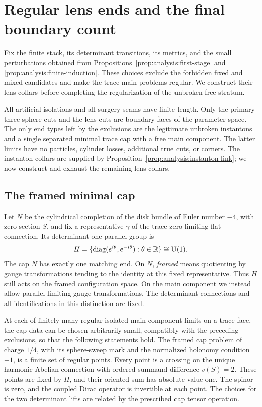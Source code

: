 \section{Regular lens ends and the final boundary count}
\label{sec:gluing}

Fix the finite stack, its determinant transitions, its metrics, and the
small perturbations obtained from Propositions~\ref{prop:analysis:first-stage}
and \ref{prop:analysis:finite-induction}.  These choices exclude the
forbidden fixed and mixed candidates and make the trace-main problems
regular.  We construct their lens collars before completing the
regularization of the unbroken free stratum.

All artificial isolations and all surgery seams have finite length.
Only the primary three-sphere cuts and the lens cuts are boundary
faces of the parameter space.  The only end types left by the exclusions
are the legitimate unbroken instantons and a single separated minimal
trace cap with a free main component.  The latter limits have no
particles, cylinder losses, additional true cuts, or corners.
The instanton collars are supplied by
Proposition~\ref{prop:analysis:instanton-link}; we now construct and
exhaust the remaining lens collars.

\subsection{The framed minimal cap}

Let $N$ be the cylindrical completion of the disk bundle of Euler number
$-4$, with zero section $S$, and fix a representative $\gamma$ of the
trace-zero limiting flat connection.  Its determinant-one parallel group
is
\[
 H=\{\operatorname{diag}(e^{i\theta},e^{-i\theta}):\theta\in\mathbb R\}
 \cong\operatorname{U}(1).
\]
The cap $N$ has exactly one matching end.  On $N$, \emph{framed}
means quotienting by gauge transformations tending
to the identity at this fixed representative.  Thus $H$ still acts on the
framed configuration space.  On the main component we instead allow
parallel limiting gauge transformations.  The determinant connections
and all identifications in this distinction are fixed.

\begin{proposition}
\label{prop:gluing:regular-cap}
At each of finitely many regular isolated main-component limits on a
trace face, the cap data can be chosen arbitrarily small, compatibly with
the preceding exclusions, so that the following statements hold.
The framed cap problem of charge $1/4$, with its sphere-sweep mark and
the normalized holonomy condition $-1$, is a finite set of regular
points.  Every point is a crossing on the unique harmonic Abelian
connection with ordered summand difference $v(S)=2$.  These points are
fixed by $H$, and their oriented sum has absolute value one.
The spinor is zero, and the coupled Dirac operator is invertible at
each point.  The choices for the two determinant lifts are related by
the prescribed cap tensor operation.
\end{proposition}

